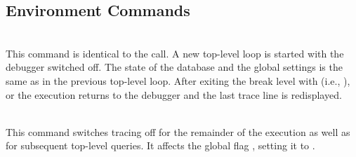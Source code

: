 \subsection{Environment Commands}
\begin{descr}{1cm}

\\
This command is identical to the
 call.
A new top-level loop is started with the debugger switched off.
The state of the database and the global settings is the same as
in the previous top-level loop.
After exiting the break level with  (i.e., ),
or 
the execution returns to the debugger and the last trace line is redisplayed.

\\
This command switches tracing off for the remainder of the execution
as well as for subsequent top-level queries. It affects the global
flag , setting it to .

%

\end{descr}

